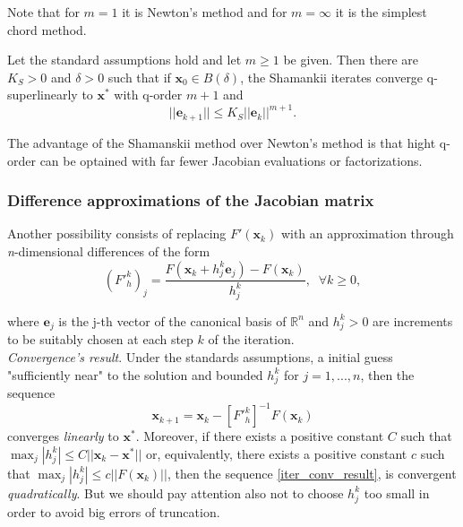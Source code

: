 Note that for $m=1$ it is Newton's method and for $m=\infty$ it is the simplest chord method.
\begin{theorem}
	Let the standard assumptions hold and let $m \geq 1$ be given. Then there are $K_{S}>0$ and $\delta>0$ such that if $\textbf{x}_{0} \in \mathit{B(\delta)}$, the Shamankii iterates converge q-superlinearly to $\textbf{x}^{*}$ with q-order $m+1$ and 
	\begin{equation*}
	||\textbf{e}_{k+1} ||\leq K_{S} ||\textbf{e}_{k} ||^{m+1}.
	\end{equation*}
\end{theorem}
The advantage of the Shamanskii method over Newton's method is that hight q-order can be optained with far fewer Jacobian evaluations or factorizations.\\

\subsubsection{Difference approximations of the Jacobian matrix} Another possibility consists of replacing $F'(\textbf{x}_{k})$ with an approximation through \textit{n}-dimensional
differences of the form
\begin{equation*}
(F'^{k}_{h})_{j} = \frac{F(\textbf{x}_{k} + h^{k}_{j} \textbf{e}_{j}) - F(\textbf{x}_{k})}{h_{j}^{k}},\;\;  \forall k \geq 0,
\end{equation*}
	
where $\textbf{e}_j$ is the j-th vector of the canonical basis of $\mathbb{R}^n$ and $h_j^k>0$ are
increments to be suitably chosen at each step $k$ of the iteration.\\
 \textit{Convergence's result}. Under the standards assumptions, a initial guess "sufficiently near" to the solution and bounded $ h^{k}_{j}$ for $j=1,...,n$, then the sequence 
 \begin{equation}
   \textbf{x}_{k+1}=\textbf{x}_k -[F'^{k}_{h}]^{-1} F(\textbf{x}_k)
   \label{iter_conv_result}
 \end{equation}
 converges \textit{linearly} to $\textbf{x}^*$. Moreover, if there exists a
 positive constant $C$ such that $\max_{j}|h^{k}_{j}| \leq C ||\textbf{x}_k - \textbf{x}^*||$	or, equivalently,
 there exists a positive constant $c$ such that $\max_{j}|h^{k}_{j}| \leq c ||F(\textbf{x}_k)||$, then
 the sequence \eqref{iter_conv_result}, is convergent \textit{quadratically}. But we should pay attention also not to choose $h_j^k$ too small in order to avoid big errors of truncation. 
 \\
 
